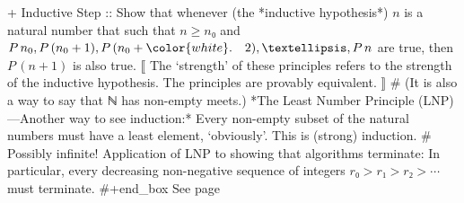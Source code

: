 \documentclass[11pt]{article}
\begin{document}
+ Inductive Step :: Show that whenever (the *inductive hypothesis*) $n$ is a  \quad natural number that such that $n ≥ n₀$ and $P\, n_0, P\, (n_0 + 1), P\, (n_0 + \newline{\color{white}.} \quad 2), …, P\, n$ are true, then $P\, (n + 1)$ is also true.  ⟦ The ‘strength’ of these principles refers to the strength of the inductive hypothesis. The principles are provably equivalent. ⟧  # (It is also a way to say that ℕ has non-empty meets.) *The Least Number Principle (LNP) ---Another way to see induction:* Every non-empty subset of the natural numbers must have a least element, ‘obviously’. This is (strong) induction. # Possibly infinite!  Application of LNP to showing that algorithms terminate: In particular, every decreasing non-negative sequence of integers $r₀ > r₁ > r₂ > ⋯$ must terminate. #+end_box See page \pageref{org-special-block-extras-glossary-declaration-site-Induction}
\end{document}
